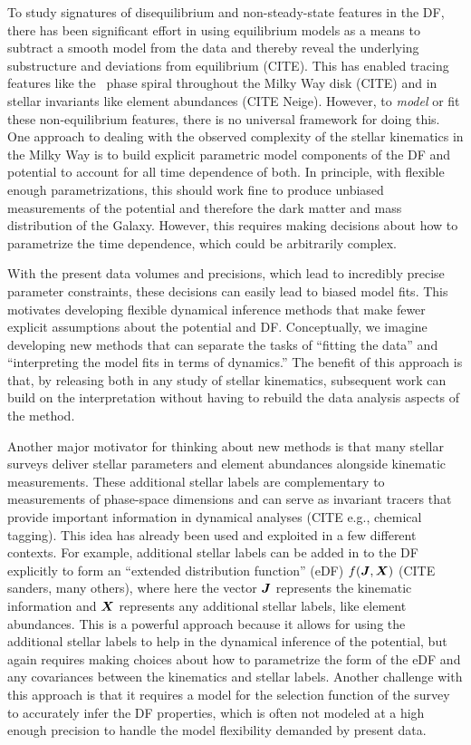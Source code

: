 To study signatures of disequilibrium and non-steady-state features in the DF, there has
been significant effort in using equilibrium models as a means to subtract a smooth
model from the data and thereby reveal the underlying substructure and deviations from
equilibrium (CITE).
This has enabled tracing features like the \gaia\ phase spiral throughout the Milky Way
disk (CITE) and in stellar invariants like element abundances (CITE Neige).
However, to \emph{model} or fit these non-equilibrium features, there is no universal
framework for doing this.
One approach to dealing with the observed complexity of the stellar kinematics in the
Milky Way is to build explicit parametric model components of the DF and potential to
account for all time dependence of both.
In principle, with flexible enough parametrizations, this should work fine to produce
unbiased measurements of the potential and therefore the dark matter and mass
distribution of the Galaxy.
However, this requires making decisions about how to parametrize the time dependence,
which could be arbitrarily complex.

With the present data volumes and precisions, which lead to incredibly precise parameter
constraints, these decisions can easily lead to biased model fits.
This motivates developing flexible dynamical inference methods that make fewer explicit
assumptions about the potential and DF.
Conceptually, we imagine developing new methods that can separate the tasks of ``fitting
the data'' and ``interpreting the model fits in terms of dynamics.''
The benefit of this approach is that, by releasing both in any study of stellar
kinematics, subsequent work can build on the interpretation without having to rebuild
the data analysis aspects of the method.

Another major motivator for thinking about new methods is that many stellar surveys
deliver stellar parameters and element abundances alongside kinematic measurements.
These additional stellar labels are complementary to measurements of phase-space
dimensions and can serve as invariant tracers that provide important information in
dynamical analyses (CITE e.g., chemical tagging).
This idea has already been used and exploited in a few different contexts.
For example, additional stellar labels can be added in to the DF explicitly to form an
``extended distribution function'' (eDF) $f(\boldsymbol{J}, \boldsymbol{X})$ (CITE sanders, many
others), where here the vector $\boldsymbol{J}$ represents the kinematic information and
$\boldsymbol{X}$ represents any additional stellar labels, like element abundances.
This is a powerful approach because it allows for using the additional stellar labels to
help in the dynamical inference of the potential, but again requires making choices
about how to parametrize the form of the eDF and any covariances between the kinematics
and stellar labels.
Another challenge with this approach is that it requires a model for the selection
function of the survey to accurately infer the DF properties, which is often not modeled
at a high enough precision to handle the model flexibility demanded by present data.

